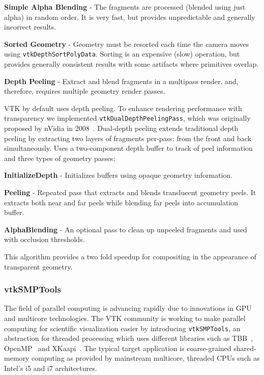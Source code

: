 \begin{compactitem}
\item \textbf{Simple Alpha Blending} - The fragments are processed (blended using just alpha) in random order.
  It is very fast, but provides unpredictable and generally incorrect results.
\item \textbf{Sorted Geometry} - Geometry must be resorted each time the camera moves using \texttt{vtkDepthSortPolyData}.
  Sorting is an expensive (slow) operation, but provides generally consistent results with some artifacts where primitives overlap.
\item \textbf{Depth Peeling} - Extract and blend fragments in a multipass render, and, therefore, requires multiple geometry render passes.
\end{compactitem}

VTK by default uses depth peeling.
To enhance rendering performance with transparency we implemented \texttt{vtkDualDepthPeelingPass}, which was originally proposed by nVidia in 2008~\cite{Bavoil:2008}.
Dual-depth peeling extends traditional depth peeling by extracting two layers of fragments per-pass: from the front and back simultaneously.
Uses a two-component depth buffer to track of peel information and three types of geometry passes:

\begin{compactitem}
\item \textbf{InitializeDepth} - Initializes buffers using opaque geometry information.
\item \textbf{Peeling} - Repeated pass that extracts and blends translucent geometry peels.
  It extracts both near and far peels while blending far peels into accumulation buffer.
\item \textbf{AlphaBlending} - An optional pass to clean up unpeeled fragments and used with occlusion thresholds.
\end{compactitem}

This algorithm provides a two fold speedup for compositing in the appearance of transparent geometry.

\subsubsection{vtkSMPTools}

The field of parallel computing is advancing rapidly due to innovations in GPU and multicore technologies.
The VTK community is working to make parallel computing for scientific visualization easier by introducing \texttt{vtkSMPTools}, an abstraction for threaded processing which uses different libraries such as TBB~\cite{TBB:2016}, OpenMP~\cite{OpenMP:2016} and XKaapi~\cite{Gautier:2013}.
The typical target application is coarse-grained shared-memory computing as provided by mainstream multicore, threaded CPUs such as Intel's i5 and i7 architectures.

